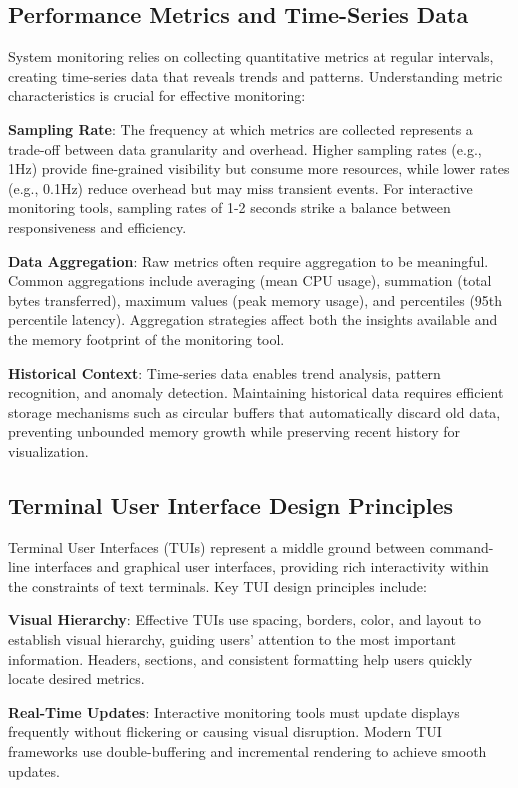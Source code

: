\documentclass[12pt,a4paper,oneside]{report}
\begin{document}
\subsection{Performance Metrics and Time-Series Data}

System monitoring relies on collecting quantitative metrics at regular intervals, creating time-series data that reveals trends and patterns. Understanding metric characteristics is crucial for effective monitoring:

\textbf{Sampling Rate}: The frequency at which metrics are collected represents a trade-off between data granularity and overhead. Higher sampling rates (e.g., 1Hz) provide fine-grained visibility but consume more resources, while lower rates (e.g., 0.1Hz) reduce overhead but may miss transient events. For interactive monitoring tools, sampling rates of 1-2 seconds strike a balance between responsiveness and efficiency.

\textbf{Data Aggregation}: Raw metrics often require aggregation to be meaningful. Common aggregations include averaging (mean CPU usage), summation (total bytes transferred), maximum values (peak memory usage), and percentiles (95th percentile latency). Aggregation strategies affect both the insights available and the memory footprint of the monitoring tool.

\textbf{Historical Context}: Time-series data enables trend analysis, pattern recognition, and anomaly detection. Maintaining historical data requires efficient storage mechanisms such as circular buffers that automatically discard old data, preventing unbounded memory growth while preserving recent history for visualization.

\subsection{Terminal User Interface Design Principles}

Terminal User Interfaces (TUIs) represent a middle ground between command-line interfaces and graphical user interfaces, providing rich interactivity within the constraints of text terminals. Key TUI design principles include:

\textbf{Visual Hierarchy}: Effective TUIs use spacing, borders, color, and layout to establish visual hierarchy, guiding users' attention to the most important information. Headers, sections, and consistent formatting help users quickly locate desired metrics.

\textbf{Real-Time Updates}: Interactive monitoring tools must update displays frequently without flickering or causing visual disruption. Modern TUI frameworks use double-buffering and incremental rendering to achieve smooth updates.
\end{document}
